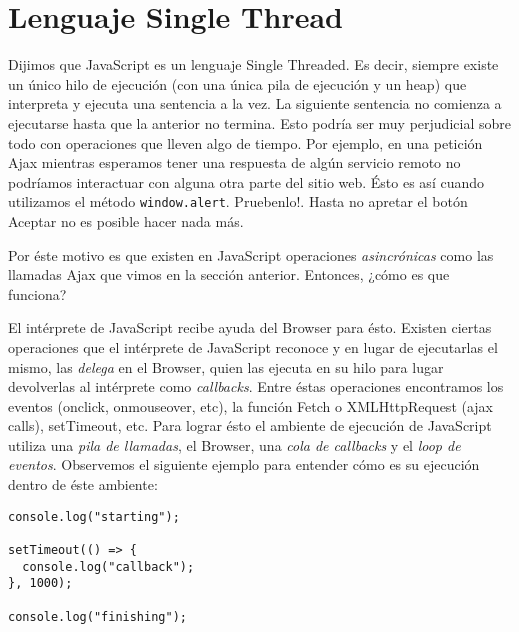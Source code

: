\documentclass[a4paper, oneside, titlepage, 12pt]{paper}
\begin{document}
\section{Lenguaje Single Thread} \label{single_thread}

Dijimos que JavaScript es un lenguaje Single Threaded. Es decir, siempre existe un único hilo de ejecución (con una única pila de ejecución y un heap) que interpreta y ejecuta una sentencia a la vez. La siguiente sentencia no comienza a ejecutarse hasta que la anterior no termina. Esto podría ser muy perjudicial sobre todo con operaciones que lleven algo de tiempo. Por ejemplo, en una petición Ajax mientras esperamos tener una respuesta de algún servicio remoto no podríamos interactuar con alguna otra parte del sitio web. Ésto es así cuando utilizamos el método \texttt{window.alert}. Pruebenlo!. Hasta no apretar el botón Aceptar no es posible hacer nada más.
\newline

Por éste motivo es que existen en JavaScript operaciones \textit{asincrónicas} como las llamadas Ajax que vimos en la sección anterior. Entonces, ¿cómo es que funciona?
\newline

El intérprete de JavaScript recibe ayuda del Browser para ésto. Existen ciertas operaciones que el intérprete de JavaScript reconoce y en lugar de ejecutarlas el mismo, las \textit{delega} en el Browser, quien las ejecuta en su hilo para lugar devolverlas al intérprete como \textit{callbacks}. Entre éstas operaciones encontramos los eventos (onclick, onmouseover, etc), la función Fetch o XMLHttpRequest (ajax calls), setTimeout, etc. Para lograr ésto el ambiente de ejecución de JavaScript utiliza una \textit{pila de llamadas}, el Browser, una \textit{cola de callbacks} y el \textit{loop de eventos}. Observemos el siguiente ejemplo para entender cómo es su ejecución dentro de éste ambiente:

\begin{verbatim}
console.log("starting");

setTimeout(() => {
  console.log("callback");
}, 1000);

console.log("finishing");
\end{verbatim}
\end{document}
